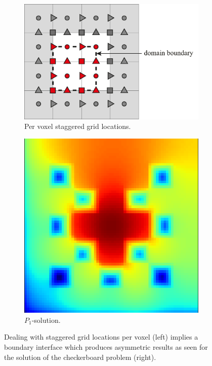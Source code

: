 \begin{figure}[h]
\centering
\begin{subfigure}[t]{0.49\columnwidth}
\centering
\includegraphics[width=1\textwidth]{04_pn_method/figures/fig_staggered_grid_domain_boundary_wrong.pdf}
\caption{Per voxel staggered grid locations.}
\label{fig:pn_staggering_asymmetry_bc}
\end{subfigure}%
\hspace{0.01\columnwidth}
\begin{subfigure}[t]{0.49\columnwidth}
\centering
\includegraphics[width=0.66\columnwidth]{04_pn_method/results/p1_staggered_grid_asymmetric_bc.png}
\caption{$P_1$-solution.}
\label{fig:pn_staggering_asymmetry_bc_checkerboard}
\end{subfigure}%
\caption{Dealing with staggered grid locations per voxel (left) implies a boundary interface which produces asymmetric results as seen for the solution of the checkerboard problem (right).}
\label{fig:pn_staggered_grid_unhandled_bc}
\end{figure}

